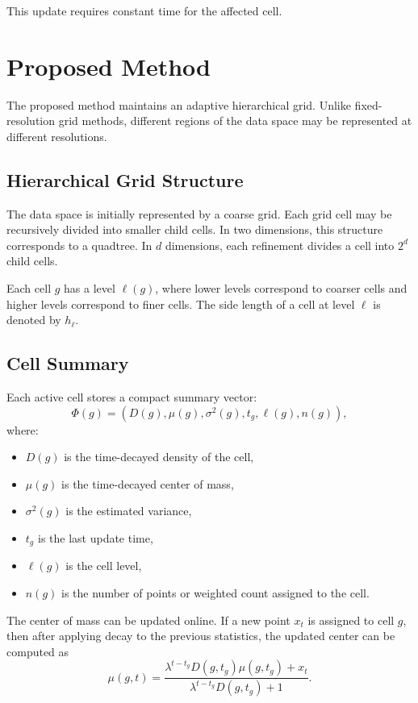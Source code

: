 \documentclass[11pt]{article}
\begin{document}
This update requires constant time for the affected cell.

\section{Proposed Method}
\label{sec:method}

The proposed method maintains an adaptive hierarchical grid. Unlike fixed-resolution grid methods, different regions of the data space may be represented at different resolutions.

\subsection{Hierarchical Grid Structure}

The data space is initially represented by a coarse grid. Each grid cell may be recursively divided into smaller child cells. In two dimensions, this structure corresponds to a quadtree. In $d$ dimensions, each refinement divides a cell into $2^d$ child cells.

Each cell $g$ has a level $\ell(g)$, where lower levels correspond to coarser cells and higher levels correspond to finer cells. The side length of a cell at level $\ell$ is denoted by $h_\ell$.

\subsection{Cell Summary}

Each active cell stores a compact summary vector:
\[
\Phi(g) =
\left(
D(g), \mu(g), \sigma^2(g), t_g, \ell(g), n(g)
\right),
\]
where:

\begin{itemize}
    \item $D(g)$ is the time-decayed density of the cell,
    \item $\mu(g)$ is the time-decayed center of mass,
    \item $\sigma^2(g)$ is the estimated variance,
    \item $t_g$ is the last update time,
    \item $\ell(g)$ is the cell level,
    \item $n(g)$ is the number of points or weighted count assigned to the cell.
\end{itemize}

The center of mass can be updated online. If a new point $x_t$ is assigned to cell $g$, then after applying decay to the previous statistics, the updated center can be computed as
\[
\mu(g,t) =
\frac{
\lambda^{t-t_g}D(g,t_g)\mu(g,t_g) + x_t
}{
\lambda^{t-t_g}D(g,t_g) + 1
}.
\]
\end{document}
